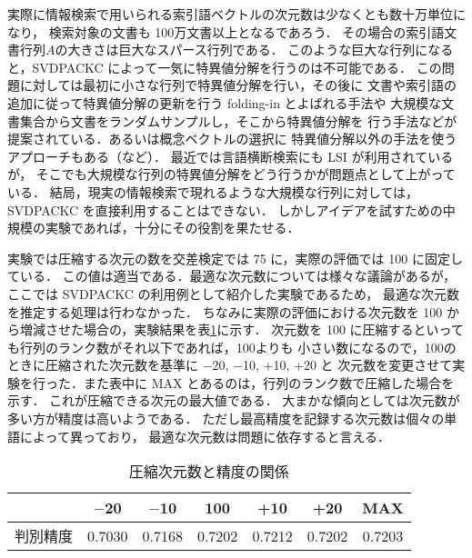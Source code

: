 実際に情報検索で用いられる索引語ベクトルの次元数は少なくとも数十万単位になり，
検索対象の文書も 100万文書以上となるであろう．
その場合の索引語文書行列\( A \)の大きさは巨大なスパース行列である．
このような巨大な行列になると，SVDPACKC によって一気に特異値分解を行うのは不可能である．
この問題に対しては最初に小さな行列で特異値分解を行い，その後に
文書や索引語の追加に従って特異値分解の更新を行う folding-in とよばれる手法や
大規模な文書集合から文書をランダムサンプルし，そこから特異値分解を
行う手法などが提案されている\cite{kita-ir}．あるいは概念ベクトルの選択に
特異値分解以外の手法を使うアプローチもある（\cite{sasaki}など）．
最近では言語横断検索にも LSI が利用されているが\cite{dumais}，
そこでも大規模な行列の特異値分解をどう行うかが問題点として上がっている\cite{mori}．
結局，現実の情報検索で現れるような大規模な行列に対しては，
SVDPACKC を直接利用することはできない．
しかしアイデアを試すための中規模の実験であれば，十分にその役割を果たせる．

実験では圧縮する次元の数を交差検定では 75 に，実際の評価では 100 に固定している．
この値は適当である．最適な次元数については様々な議論があるが，
ここでは SVDPACKC の利用例として紹介した実験であるため，
最適な次元数を推定する処理は行わなかった．
ちなみに実際の評価における次元数を 100 から増減させた場合の，実験結果を\mbox{表\ref{jigen}}に示す．
次元数を 100 に圧縮するといっても行列のランク数がそれ以下であれば，100よりも
小さい数になるので，100のときに圧縮された次元数を基準に $-$20, $-$10, +10, +20 と
次元数を変更させて実験を行った．また表中に MAX とあるのは，行列のランク数で圧縮した場合を示す．
これが圧縮できる次元の最大値である．
大まかな傾向としては次元数が多い方が精度は高いようである．
ただし最高精度を記録する次元数は個々の単語によって異っており，
最適な次元数は問題に依存すると言える．

\begin{table}[htbp]
  \begin{center}
    \leavevmode
    \caption{圧縮次元数と精度の関係}\label{jigen}
    \begin{tabular}{|c|c|c|c|c|c|c|} \hline
                &   $-$20  &  $-$10    & 100      & +10       & +20      & MAX   \\  \hline
判別精度        &  0.7030 &  0.7168 & 0.7202  &  0.7212   &  0.7202  & 0.7203 \\ \hline
    \end{tabular}
  \end{center}
\end{table}

